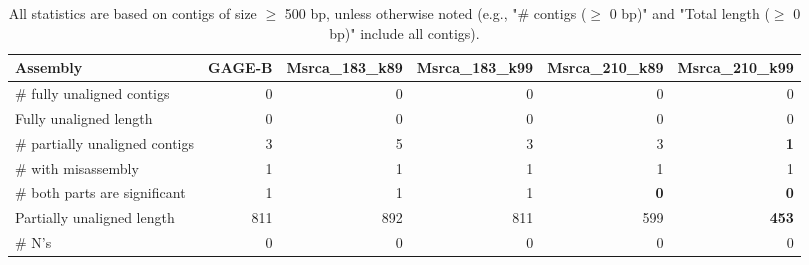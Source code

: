 \documentclass[12pt,a4paper]{article}
\begin{document}
\begin{table}[ht]
\begin{center}
\caption{All statistics are based on contigs of size $\geq$ 500 bp, unless otherwise noted (e.g., "\# contigs ($\geq$ 0 bp)" and "Total length ($\geq$ 0 bp)" include all contigs).}
\begin{tabular}{|l*{5}{|r}|}
\hline
Assembly & GAGE-B & Msrca\_183\_k89 & Msrca\_183\_k99 & Msrca\_210\_k89 & Msrca\_210\_k99 \\ \hline
\# fully unaligned contigs & 0 & 0 & 0 & 0 & 0 \\ \hline
Fully unaligned length & 0 & 0 & 0 & 0 & 0 \\ \hline
\# partially unaligned contigs & 3 & 5 & 3 & 3 & {\bf 1} \\ \hline
\hspace{5mm}\# with misassembly & 1 & 1 & 1 & 1 & 1 \\ \hline
\hspace{5mm}\# both parts are significant & 1 & 1 & 1 & {\bf 0} & {\bf 0} \\ \hline
Partially unaligned length & 811 & 892 & 811 & 599 & {\bf 453} \\ \hline
\# N's & 0 & 0 & 0 & 0 & 0 \\ \hline
\end{tabular}
\end{center}
\end{table}
\end{document}
